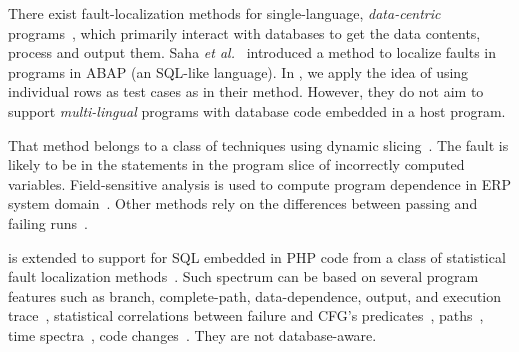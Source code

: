 There exist fault-localization methods for single-language,
{\em data-centric} programs~\cite{dor-issta08,litvak10,saha11}, which
primarily interact with databases to get the data contents, process
and output them. Saha {\em et al.}~\cite{saha11} introduced a method
to localize faults in programs in ABAP (an SQL-like language). In
{\tool}, we apply the idea of using individual rows as test cases as
in their method.
However, they do not aim to support {\em multi-lingual} programs with
database code embedded in a host program. 


That method belongs to a class of techniques using dynamic
slicing~\cite{dor-issta08,litvak10,zhang-pldi04,cleve-icsm10}.
The fault is likely to be in the statements in the
program slice of incorrectly computed variables.
Field-sensitive analysis is used to compute program dependence
in ERP system domain~\cite{litvak10}.  Other methods rely on
the differences between passing and failing
runs~\cite{dallmeier-ecoop05,mani-ase10}.

{\tool} is extended to support for SQL embedded in PHP code from a
class of statistical fault localization
methods~\cite{tarantula05,abreu-ochiai-07,liblit-pldi05}.
Such spectrum can be based on several program features such as branch,
complete-path, data-dependence, output, and execution
trace~\cite{harrold00,santelices09,zhang-fse09,apollo-tse10},
statistical correlations between failure and CFG's
predicates~\cite{liblit-pldi05}, paths~\cite{holmes-icse09},
time spectra~\cite{timespectra08}, code
changes~\cite{stoerzer-fse06}. They are not database-aware.

